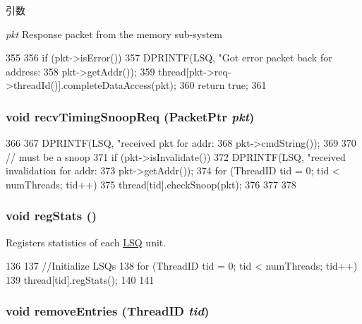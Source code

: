 \begin{DoxyParams}{引数}
\item[{\em pkt}]Response packet from the memory sub-\/system \end{DoxyParams}



\begin{DoxyCode}
355 {
356     if (pkt->isError())
357         DPRINTF(LSQ, "Got error packet back for address: %
358                 pkt->getAddr());
359     thread[pkt->req->threadId()].completeDataAccess(pkt);
360     return true;
361 }
\end{DoxyCode}
\hypertarget{classLSQ_aff3031c56fc4947a19695c868bb8233e}{
\subsubsection[{recvTimingSnoopReq}]{\setlength{\rightskip}{0pt plus 5cm}void recvTimingSnoopReq ({\bf PacketPtr} {\em pkt})}}
\label{classLSQ_aff3031c56fc4947a19695c868bb8233e}



\begin{DoxyCode}
366 {
367     DPRINTF(LSQ, "received pkt for addr:%
368             pkt->cmdString());
369 
370     // must be a snoop
371     if (pkt->isInvalidate()) {
372         DPRINTF(LSQ, "received invalidation for addr:%
373                 pkt->getAddr());
374         for (ThreadID tid = 0; tid < numThreads; tid++) {
375             thread[tid].checkSnoop(pkt);
376         }
377     }
378 }
\end{DoxyCode}
\hypertarget{classLSQ_a4dc637449366fcdfc4e764cdf12d9b11}{
\subsubsection[{regStats}]{\setlength{\rightskip}{0pt plus 5cm}void regStats ()}}
\label{classLSQ_a4dc637449366fcdfc4e764cdf12d9b11}
Registers statistics of each \hyperlink{classLSQ}{LSQ} unit. 


\begin{DoxyCode}
136 {
137     //Initialize LSQs
138     for (ThreadID tid = 0; tid < numThreads; tid++) {
139         thread[tid].regStats();
140     }
141 }
\end{DoxyCode}
\hypertarget{classLSQ_a53a4e3e73adce8cf2b544117971131c5}{
\subsubsection[{removeEntries}]{\setlength{\rightskip}{0pt plus 5cm}void removeEntries ({\bf ThreadID} {\em tid})}}
\label{classLSQ_a53a4e3e73adce8cf2b544117971131c5}



